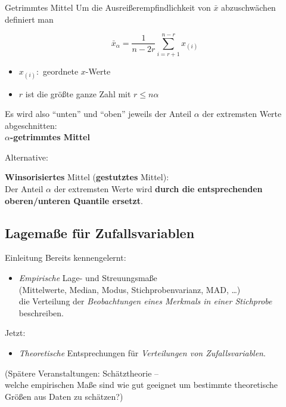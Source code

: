 \documentclass[
  10pt,
  ignorenonframetext,
]{beamer}
\providecommand{\tightlist}{%
  \setlength{\itemsep}{0pt}\setlength{\parskip}{0pt}}
\begin{document}
\begin{frame}{Getrimmtes Mittel}
\protect\hypertarget{getrimmtes-mittel}{}
Um die Ausreißerempfindlichkeit von \(\bar x\) abzuschwächen definiert
man

\begin{equation*}
    \bar x_{\alpha} = \frac{1}{n-2r} \sum_{i=r+1}^{n-r} x_{(i)}
\end{equation*}

\begin{itemize}
\tightlist
\item
  \(x_{(i)}:\) geordnete \(x\)-Werte
\item
  \(r\) ist die größte ganze Zahl mit \(r \leq n \alpha\)
\end{itemize}

Es wird also ``unten'' und ``oben'' jeweils der Anteil \(\alpha\) der
extremsten Werte abgeschnitten:\\
\textbf{\(\alpha\)-getrimmtes Mittel}

Alternative:

\textbf{Winsorisiertes} Mittel (\textbf{gestutztes} Mittel):\\
Der Anteil \(\alpha\) der extremsten Werte wird \textbf{durch die
entsprechenden oberen/unteren Quantile ersetzt}.
\end{frame}

\hypertarget{lagemauxdfe-fuxfcr-zufallsvariablen}{%
\subsection{Lagemaße für
Zufallsvariablen}\label{lagemauxdfe-fuxfcr-zufallsvariablen}}

\begin{frame}{Einleitung}
\protect\hypertarget{einleitung}{}
Bereits kennengelernt:

\begin{itemize}
\tightlist
\item
  \emph{Empirische} Lage- und Streuungsmaße\\
  (Mittelwerte, Median, Modus, Stichprobenvarianz, MAD, \ldots)\\
  die Verteilung der \emph{Beobachtungen eines Merkmals in einer
  Stichprobe} beschreiben.
\end{itemize}

Jetzt:

\begin{itemize}
\tightlist
\item
  \emph{Theoretische} Entsprechungen für \emph{Verteilungen von
  Zufallsvariablen}.
\end{itemize}

(Spätere Veranstaltungen: Schätztheorie --\\
welche empirischen Maße sind wie gut geeignet um bestimmte theoretische
Größen aus Daten zu schätzen?)
\end{frame}
\end{document}
